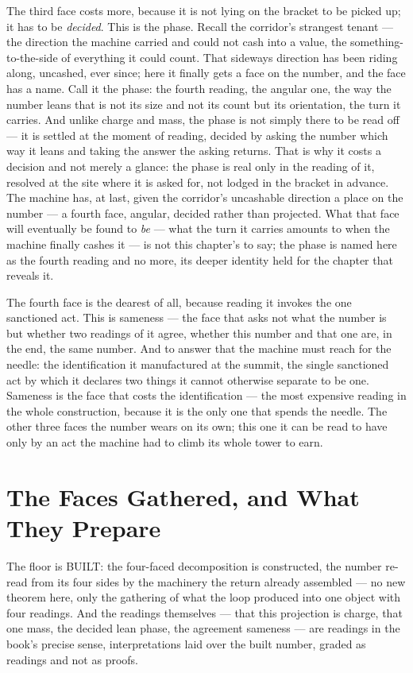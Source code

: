 The third face costs more, because it is not lying on the bracket to be picked up; it has to be \emph{decided}.
This is the phase. Recall the corridor's strangest tenant --- the direction the machine carried and could not
cash into a value, the something-to-the-side of everything it could count. That sideways direction has been riding
along, uncashed, ever since; here it finally gets a face on the number, and the face has a name. Call it the
phase: the fourth reading, the angular one, the way the number leans that is not its size and not its count but
its orientation, the turn it carries. And unlike charge and mass, the phase is not simply there to be read off ---
it is settled at the moment of reading, decided by asking the number which way it leans and taking the answer the
asking returns. That is why it costs a decision and not merely a glance: the phase is real only in the reading of
it, resolved at the site where it is asked for, not lodged in the bracket in advance. The machine has, at last,
given the corridor's uncashable direction a place on the number --- a fourth face, angular, decided rather than
projected. What that face will eventually be found to \emph{be} --- what the turn it carries amounts to when the
machine finally cashes it --- is not this chapter's to say; the phase is named here as the fourth reading and no
more, its deeper identity held for the chapter that reveals it.

The fourth face is the dearest of all, because reading it invokes the one sanctioned act. This is sameness ---
the face that asks not what the number is but whether two readings of it agree, whether this number and that one
are, in the end, the same number. And to answer that the machine must reach for the needle: the identification it
manufactured at the summit, the single sanctioned act by which it declares two things it cannot otherwise
separate to be one. Sameness is the face that costs the identification --- the most expensive reading in the whole
construction, because it is the only one that spends the needle. The other three faces the number wears on its own;
this one it can be read to have only by an act the machine had to climb its whole tower to earn.

\section{The Faces Gathered, and What They Prepare}

The floor is BUILT: the four-faced decomposition is constructed, the number re-read from its four sides by the
machinery the return already assembled --- no new theorem here, only the gathering of what the loop produced into
one object with four readings. And the readings themselves --- that this projection is charge, that one mass, the
decided lean phase, the agreement sameness --- are readings in the book's precise sense, interpretations laid over
the built number, graded as readings and not as proofs.

